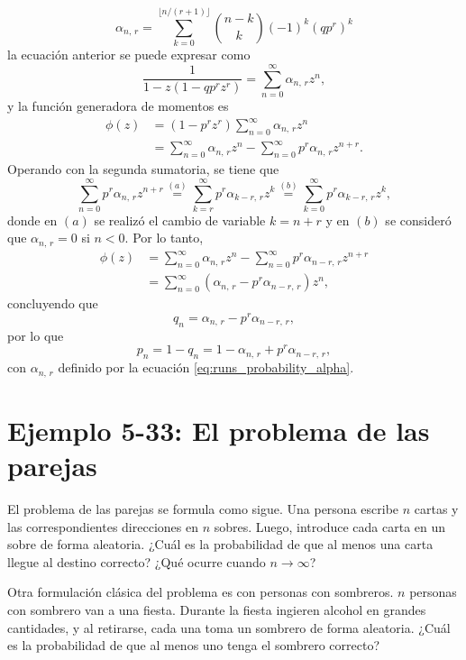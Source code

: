 \documentclass[a4paper]{report}
\begin{document}
\begin{equation}\label{eq:runs_probability_alpha}
 \alpha_{n,\,r}=\sum_{k=0}^{\lfloor n/(r+1)\rfloor}\binom{n-k}{k}(-1)^k(qp^r)^k
\end{equation}
la ecuación anterior se puede expresar como
\[
 \frac{1}{1-z(1-qp^rz^{r})}=\sum_{n=0}^{\infty}\alpha_{n,\,r}z^n,
\]
y la función generadora de momentos es
\begin{align*}
 \phi(z)&=(1-p^rz^r)\sum_{n=0}^{\infty}\alpha_{n,\,r}z^n\\
   &=\sum_{n=0}^{\infty}\alpha_{n,\,r}z^n-\sum_{n=0}^{\infty}p^r\alpha_{n,\,r}z^{n+r}.
\end{align*}
Operando con la segunda sumatoria, se tiene que
\[
 \sum_{n=0}^{\infty}p^r\alpha_{n,\,r}z^{n+r}\overset{(a)}{=}\sum_{k=r}^{\infty}p^r\alpha_{k-r,\,r}z^{k}\overset{(b)}{=}\sum_{k=0}^{\infty}p^r\alpha_{k-r,\,r}z^{k},
\]
donde en \((a)\) se realizó el cambio de variable \(k=n+r\) y en \((b)\) se consideró que \(\alpha_{n,\,r}=0\) si \(n<0\). Por lo tanto,
\begin{align*}
 \phi(z)&=\sum_{n=0}^{\infty}\alpha_{n,\,r}z^n-\sum_{n=0}^{\infty}p^r\alpha_{n-r,\,r}z^{n+r}\\
   &=\sum_{n=0}^{\infty}\left(\alpha_{n,\,r}-p^r\alpha_{n-r,\,r}\right)z^n,
\end{align*}
concluyendo que
\[
 q_n=\alpha_{n,\,r}-p^r\alpha_{n-r,\,r},
\]
por lo que 
\[
 p_n=1-q_n=1-\alpha_{n,\,r}+p^r\alpha_{n-r,\,r},
\]
con \(\alpha_{n,\,r}\) definido por la ecuación \ref{eq:runs_probability_alpha}.

\section{Ejemplo 5-33: El problema de las parejas}

El problema de las parejas se formula como sigue. Una persona escribe \(n\) cartas y las correspondientes direcciones en \(n\) sobres. Luego, introduce cada carta en un sobre de forma aleatoria. ¿Cuál es la probabilidad de que al menos una carta llegue al destino correcto? ¿Qué ocurre cuando \(n\to\infty\)?

Otra formulación clásica del problema es con personas con sombreros. \(n\) personas con sombrero van a una fiesta. Durante la fiesta ingieren alcohol en grandes cantidades, y al retirarse, cada una toma un sombrero de forma aleatoria. ¿Cuál es la probabilidad de que al menos uno tenga el sombrero correcto?
\end{document}
